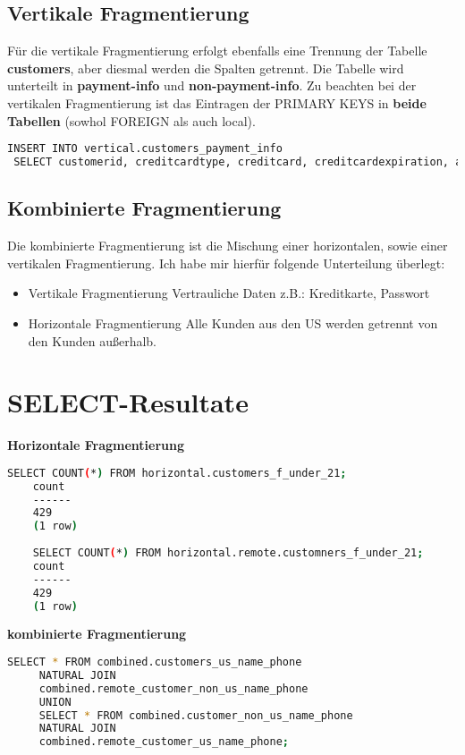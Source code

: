 \subsection{Vertikale Fragmentierung}
 Für die vertikale Fragmentierung erfolgt ebenfalls eine Trennung der Tabelle \textbf{customers},
 aber diesmal werden die Spalten getrennt. Die Tabelle wird unterteilt in \textbf{payment-info} und
 \textbf{non-payment-info}. Zu beachten bei der vertikalen Fragmentierung ist das Eintragen der PRIMARY KEYS in \textbf{beide Tabellen} (sowhol FOREIGN als auch local).
 
 \begin{lstlisting}[language=bash,caption={Vertikale Fragmentierung}]
 INSERT INTO vertical.customers_payment_info
 SELECT customerid, creditcardtype, creditcard, creditcardexpiration, age, income FROM customers;
 \end{lstlisting}
 
 \subsection{Kombinierte Fragmentierung}
 Die kombinierte Fragmentierung ist die Mischung einer horizontalen, sowie einer vertikalen Fragmentierung.
 Ich habe mir hierfür folgende Unterteilung überlegt:
 
 \begin{itemize}
 	\item Vertikale Fragmentierung
	 	\subitem Vertrauliche Daten z.B.: Kreditkarte, Passwort
	\item Horizontale Fragmentierung
		\subitem Alle Kunden aus den US werden getrennt von den Kunden außerhalb.
 \end{itemize}
 
 \section{SELECT-Resultate}
 
 \textbf{Horizontale Fragmentierung}
 \begin{lstlisting}[language=bash,caption={SELECT-horizontal}]
	SELECT COUNT(*) FROM horizontal.customers_f_under_21;
	count
	------
	429
	(1 row)
	
	SELECT COUNT(*) FROM horizontal.remote.customners_f_under_21;
	count
	------
	429
	(1 row)
 \end{lstlisting}
 
 \textbf{kombinierte Fragmentierung}
  \begin{lstlisting}[language=bash,caption={SELECT-combined}]
	 SELECT * FROM combined.customers_us_name_phone
	 NATURAL JOIN
	 combined.remote_customer_non_us_name_phone
	 UNION
	 SELECT * FROM combined.customer_non_us_name_phone
	 NATURAL JOIN
	 combined.remote_customer_us_name_phone;
  \end{lstlisting}

